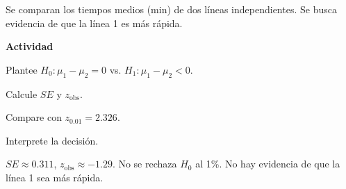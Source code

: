 \begin{ejercicio}
Se comparan los tiempos medios (min) de dos líneas independientes. Se busca evidencia de que la línea 1 es más rápida.


\textbf{Actividad}
\begin{pasos}
  \item Plantee $H_0:\mu_1-\mu_2=0$ vs. $H_1:\mu_1-\mu_2<0$.
  \item Calcule $SE$ y $z_{\text{obs}}$.
  \item Compare con $z_{0.01}=2.326$.
  \item Interprete la decisión.
\end{pasos}

\begin{clave}
$SE\approx 0.311$, $z_{\text{obs}}\approx -1.29$.
No se rechaza $H_0$ al 1\%. No hay evidencia de que la línea 1 sea más rápida.
\end{clave}
\end{ejercicio}

